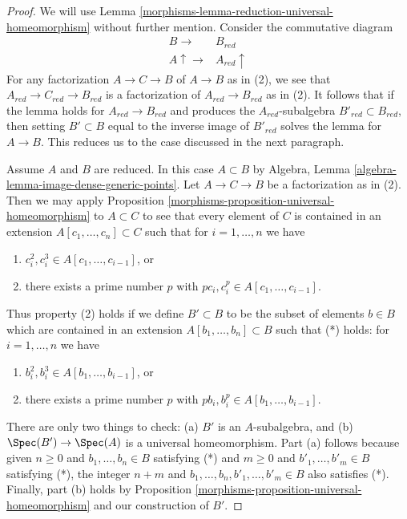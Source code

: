 \begin{proof}

We will use Lemma \ref{morphisms-lemma-reduction-universal-homeomorphism}
without further mention. Consider the commutative diagram
$$
\begin{array}{cc}B \longrightarrow & B_{red} \\ A \uparrow\longrightarrow & A_{red} \uparrow\end{array}
$$
For any factorization $A \to C \to B$ of $A \to B$ as in (2), we see
that $A_{red} \to C_{red} \to B_{red}$ is a factorization of
$A_{red} \to B_{red}$ as in (2). It follows that if the
lemma holds for $A_{red} \to B_{red}$ and produces the $A_{red}$-subalgebra
$B'_{red} \subset B_{red}$, then setting $B' \subset B$
equal to the inverse image of $B'_{red}$ solves the lemma for
$A \to B$. This reduces us to the case discussed in the next paragraph.

\medskip\noindent
Assume $A$ and $B$ are reduced. In this case $A \subset B$ by
Algebra, Lemma \ref{algebra-lemma-image-dense-generic-points}.
Let $A \to C \to B$ be a factorization as in (2).
Then we may apply Proposition \ref{morphisms-proposition-universal-homeomorphism}
to $A \subset C$ to see that every element of $C$ is contained
in an extension $A[c_1, \ldots, c_n] \subset C$ such that for
$i = 1, \ldots, n$ we have
\begin{enumerate}
\item $c_i^2, c_i^3 \in A[c_1, \ldots, c_{i - 1}]$, or
\item there exists a prime number $p$ with
$pc_i, c_i^p \in A[c_1, \ldots, c_{i - 1}]$.
\end{enumerate}
Thus property (2) holds if we define $B' \subset B$ to be the
subset of elements $b \in B$ which are contained in an extension
$
A[b_1, \ldots, b_n] \subset B
$
such that (*) holds: for $i = 1, \ldots, n$ we have
\begin{enumerate}
\item $b_i^2, b_i^3 \in A[b_1, \ldots, b_{i - 1}]$, or
\item there exists a prime number $p$ with
$pb_i, b_i^p \in A[b_1, \ldots, b_{i - 1}]$.
\end{enumerate}
There are only two things to check: (a) $B'$ is an $A$-subalgebra, and
(b) $\Spec(B') \to \Spec(A)$ is a universal homeomorphism.
Part (a) follows because given $n \geq 0$ and $b_1, \ldots, b_n \in B$
satisfying (*) and $m \geq 0$ and $b'_1, \ldots, b'_m \in B$
satisfying (*), the integer
$n + m$ and $b_1, \ldots, b_n, b'_1, \ldots, b'_m \in B$
also satisfies (*). Finally, part (b) holds by
Proposition \ref{morphisms-proposition-universal-homeomorphism} and our construction
of $B'$.
\end{proof}

